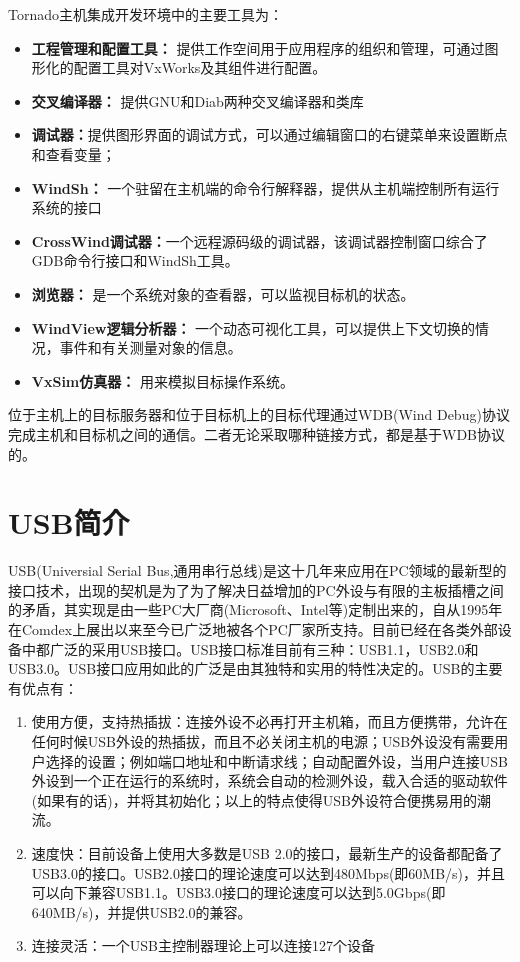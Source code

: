 Tornado主机集成开发环境中的主要工具为：
\begin{itemize}
\item \textbf{工程管理和配置工具：} 提供工作空间用于应用程序的组织和管理，可通过图形化的配置工具对VxWorks及其组件进行配置。
\item \textbf{交叉编译器：} 提供GNU和Diab两种交叉编译器和类库
\item \textbf{调试器：}提供图形界面的调试方式，可以通过编辑窗口的右键菜单来设置断点和查看变量；
\item \textbf{WindSh：} 一个驻留在主机端的命令行解释器，提供从主机端控制所有运行系统的接口
\item \textbf{CrossWind调试器：}一个远程源码级的调试器，该调试器控制窗口综合了GDB命令行接口和WindSh工具。
\item \textbf{浏览器：} 是一个系统对象的查看器，可以监视目标机的状态。
\item \textbf{WindView逻辑分析器：} 一个动态可视化工具，可以提供上下文切换的情况，事件和有关测量对象的信息。
\item \textbf{VxSim仿真器：} 用来模拟目标操作系统。
\end{itemize}

	位于主机上的目标服务器和位于目标机上的目标代理通过WDB(Wind Debug)协议完成主机和目标机之间的通信。二者无论采取哪种链接方式，都是基于WDB协议的。


\section{USB简介}
	USB(Universial Serial Bus,通用串行总线)是这十几年来应用在PC领域的最新型的接口技术，出现的契机是为了为了解决日益增加的PC外设与有限的主板插槽之间的矛盾，其实现是由一些PC大厂商(Microsoft、Intel等)定制出来的，自从1995年在Comdex上展出以来至今已广泛地被各个PC厂家所支持。目前已经在各类外部设备中都广泛的采用USB接口。USB接口标准目前有三种：USB1.1，USB2.0和USB3.0。USB接口应用如此的广泛是由其独特和实用的特性决定的。USB的主要有优点有：
\begin{enumerate}
\item 使用方便，支持热插拔：连接外设不必再打开主机箱，而且方便携带，允许在任何时候USB外设的热插拔，而且不必关闭主机的电源；USB外设没有需要用户选择的设置；例如端口地址和中断请求线；自动配置外设，当用户连接USB外设到一个正在运行的系统时，系统会自动的检测外设，载入合适的驱动软件(如果有的话)，并将其初始化；以上的特点使得USB外设符合便携易用的潮流。
\item 速度快：目前设备上使用大多数是USB 2.0的接口，最新生产的设备都配备了USB3.0的接口。USB2.0接口的理论速度可以达到480Mbps(即60MB/s)，并且可以向下兼容USB1.1。USB3.0接口的理论速度可以达到5.0Gbps(即640MB/s)，并提供USB2.0的兼容。
\item 连接灵活：一个USB主控制器理论上可以连接127个设备
\end{enumerate}


